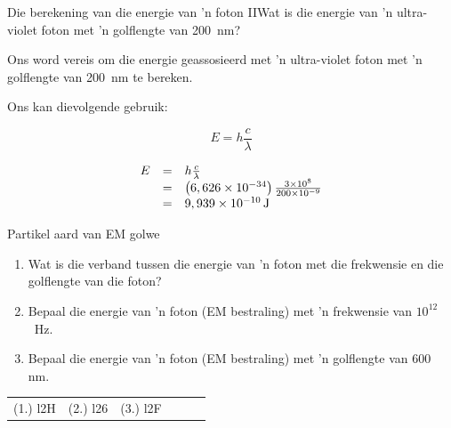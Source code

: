   \begin{wex}{Die berekening van die energie van 'n foton II}{Wat is die energie van 'n ultra-violet foton met 'n golflengte van 200~nm?}{
      \label{m38778*id189184}Ons word vereis om die energie geassosieerd met 'n ultra-violet foton met 'n golflengte van 200~nm te bereken.\par 
      \label{m38778*id189190}Ons kan dievolgende gebruik:\par 
      \label{m38778*id189193}\nopagebreak\noindent{}
        
    \begin{equation}
    E=h\frac{c}{\lambda }
      \end{equation}
      \label{m38778*id189220}\nopagebreak\noindent{}
    
    \begin{equation}
    \begin{array}{ccc}\hfill E& =& h\frac{c}{\lambda }\hfill \\ & =& \left(6,626\ensuremath{\times}{10}^{-34}\right)\frac{3\ensuremath{\times}{10}^{8}}{200\ensuremath{\times}{10}^{-9}}\hfill \\ & =& 9,939\ensuremath{\times}{10}^{-10}\phantom{\rule{0.166667em}{0ex}}\text{J}\hfill \end{array}
      \end{equation}}
         \end{wex}
      \label{m38778*uid13}
            \begin{exercises}{Partikel aard van EM golwe}
            \nopagebreak
        \label{m38778*id189384}\begin{enumerate}[noitemsep, label=\textbf{\arabic*}. ]
            \label{m38778*uid14}\item Wat is die verband tussen die energie van 'n foton met die frekwensie en die golflengte van die foton? \newline
\label{m38778*uid15}\item Bepaal die energie van 'n foton (EM bestraling) met 'n frekwensie van ${10}^{12}$~Hz.\newline
\label{m38778*uid16}\item Bepaal die energie van 'n foton (EM bestraling) met 'n golflengte van 600 nm.\newline
\end{enumerate}
  \label{m38778**end}
\practiceinfo
 \par \begin{tabular}[h]{cccccc}
 (1.) l2H  &  (2.) l26  &  (3.) l2F  & \end{tabular}
\end{exercises}
            
